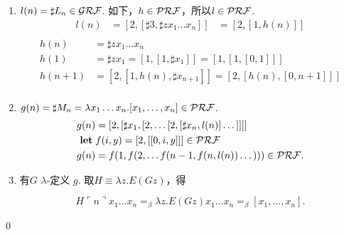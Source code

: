\begin{pf} \rm 
   \begin{enumerate}
       \item $l(n) = \sharp L_n\in\mathcal{GRF}$. 如下，$h\in\mathcal{PRF}$，所以$l\in\mathcal{PRF}$.
    $$
    \begin{aligned}
        l(n) &= [2, [\sharp 3, \sharp zx_1\dots x_n]] 
        &= [2, [1, h(n)]]\\
    \end{aligned}
    $$
    $$
    \begin{aligned}
        h(n) &= \sharp zx_1\dots x_n \\
        h(1) &= \sharp  zx_1 = [1,[1,\sharp x_1]] = [1, [1, [0,1]]] \\   
        h(n+1) &= [2, [1, h(n), \sharp x_{n+1}]] = [2, [h(n), [0, n+1]]]\\
    \end{aligned}
    $$
    \item $g(n) = \sharp M_n = \lambda x_1\dots x_n. [x_1, \dots, x_n]\in\mathcal{PRF}$.
    $$
    \begin{aligned}
        g(n) &= [2, [\sharp x_1, [2, \dots [2, [\sharp x_n, l(n)]\dots]]]]\\
        \mathbf{let}\; &f(i, y) = [2, [[0, i, y]]]\in \mathcal{PRF}\\
        g(n) &= f(1, f(2, \dots f(n-1, f(n, l(n))\dots)))\in\mathcal{PRF}.
    \end{aligned}
    $$
    \item 有$G$ $\lambda$-定义 $g$. 取$H\equiv \lambda z.E(Gz)$，得
    
    $$H\ulcorner n\urcorner x_1\dots x_n =_\beta \lambda z. E(Gz) x_1\dots x_n =_\beta [x_1, \dots, x_n].$$
   \end{enumerate}
   \qed
\end{pf}